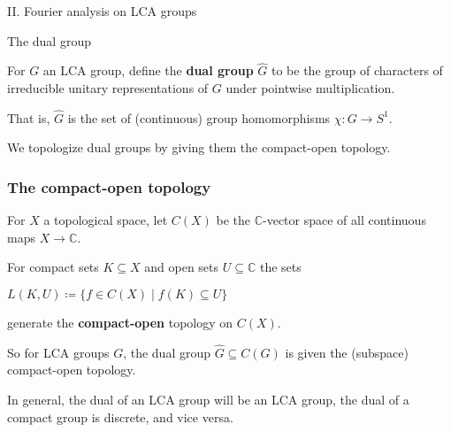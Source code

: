 \documentclass[mathserif
, handout
]{beamer}
\begin{document}
\begin{frame}{}
    \begin{block}{}{
        \begin{center}\Large II. Fourier analysis on LCA groups\end{center}}
    \end{block}
\end{frame}

\begin{frame}{The dual group}
    \begin{definition}
        For $G$ an LCA group, define the \textbf{dual group} $\widehat{\hspace{0pt}G}$ to be the group of characters of irreducible unitary representations of $G$ under pointwise multiplication.\pause 
        
        That is, $\widehat{\hspace{0pt}G}$ is the set of (continuous) group homomorphisms $\chi\colon G\to S^1$.
    \end{definition} %
    \pause

    We topologize dual groups by giving them the compact-open topology.
\end{frame}

\begin{frame}
    \frametitle{The compact-open topology}
    \begin{definition}
        For $X$ a topological space, let $C(X)$ be the $\mathbb{C}$-vector space of all continuous maps $X\to \mathbb C$.
        \pause 

        For compact sets $K\subseteq X$ and open sets $U\subseteq \mathbb C$ the sets \begin{center}
            $L(K,U)\coloneqq\{f\in C(X)\mid f(K)\subseteq U\}$
        \end{center} generate the \textbf{compact-open} topology on $C(X)$.
    \end{definition} 
    \pause
    
    So for LCA groups $G$, the dual group $\widehat{\hspace{0pt}G}\subseteq C(G)$ is given the (subspace) compact-open topology.\pause 

    In general, the dual of an LCA group will be an LCA group, the dual of a compact group is discrete, and vice versa.
\end{frame}
\end{document}
